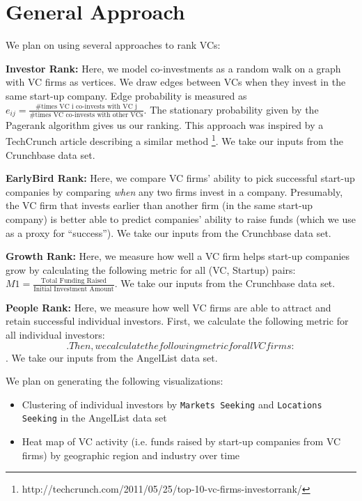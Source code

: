 \documentclass{article}
\begin{document}
\section{General Approach}
We plan on using several approaches to rank VCs:

{\bf Investor Rank:} Here, we model co-investments as a random walk on a graph with VC firms as vertices. We draw edges between VCs when they invest in the same start-up company. Edge probability is measured as $e_{ij} = \frac{\text{\# times VC i co-invests with VC j}}{\text{\# times VC co-invests with other VCs}}$. The stationary probability given by the Pagerank algorithm gives us our ranking. This approach was inspired by a TechCrunch article describing a similar method \footnote{http://techcrunch.com/2011/05/25/top-10-vc-firms-investorrank/}. We take our inputs from the Crunchbase data set.

{\bf EarlyBird Rank:} Here, we compare VC firms' ability to pick successful start-up companies by comparing \emph{when} any two firms invest in a company. Presumably, the VC firm that invests earlier than another firm (in the same start-up company) is better able to predict companies' ability to raise funds (which we use as a proxy for ``success''). We take our inputs from the Crunchbase data set.

{\bf Growth Rank:} Here, we measure how well a VC firm helps start-up companies grow by calculating the following metric for all (VC, Startup) pairs: $M1 = \frac{\text{Total Funding Raised}}{\text{Initial Investment Amount}}$. We take our inputs from the Crunchbase data set.

{\bf People Rank:} Here, we measure how well VC firms are able to attract and retain successful individual investors. First, we calculate the following metric for all individual investors: $$. Then, we calculate the following metric for all VC firms: $$. We take our inputs from the AngelList data set.

We plan on generating the following visualizations:

\begin{itemize}
\item{Clustering of individual investors by \verb+Markets Seeking+ and \verb+Locations Seeking+ in the AngelList data set}
\item{Heat map of VC activity (i.e. funds raised by start-up companies from VC firms) by geographic region and industry over time}
\end{itemize}
\end{document}
